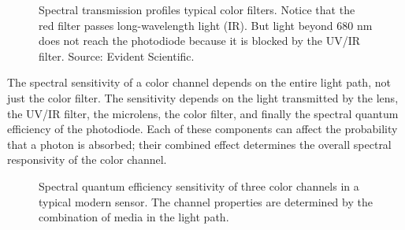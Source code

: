 \documentclass[
  letterpaper,
]{book}
\begin{document}
\begin{figure}


\caption{\label{fig-cfa-spectral}Spectral transmission profiles typical
color filters. Notice that the red filter passes long-wavelength light
(IR). But light beyond 680 nm does not reach the photodiode because it
is blocked by the UV/IR filter. Source: Evident Scientific.}

\end{figure}%

The spectral sensitivity of a color channel depends on the entire light
path, not just the color filter. The sensitivity depends on the light
transmitted by the lens, the UV/IR filter, the microlens, the color
filter, and finally the spectral quantum efficiency of the photodiode.
Each of these components can affect the probability that a photon is
absorbed; their combined effect determines the overall spectral
responsivity of the color channel.

\begin{figure}


\caption{\label{fig-channel-spectral}Spectral quantum efficiency
sensitivity of three color channels in a typical modern sensor. The
channel properties are determined by the combination of media in the
light path.}

\end{figure}%
\end{document}
